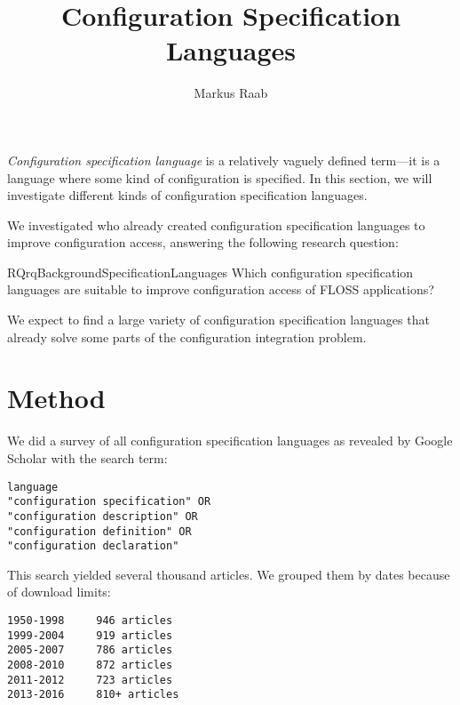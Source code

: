 



\setcounter{chapter}{1} %


\title{Configuration Specification Languages}
\author{Markus Raab}




\begin{titlingpage}
\maketitle
\doclicenseThis
\end{titlingpage}

\textit{Configuration specification language}
is a relatively vaguely defined term---it is a language where some kind of configuration is specified.
In this section, we will investigate different kinds of configuration specification languages.

We investigated who already created configuration specification languages to improve configuration access, answering the following research question:
\begin{restatable}{RQ}{rqBackgroundSpecificationLanguages}
 \label{rq:background-specification-languages}
 Which configuration specification languages are suitable to improve configuration access of FLOSS applications?
\end{restatable}

\begin{hypothesis}
We expect to find a large variety of configuration specification languages that already solve some parts of the configuration integration problem.
\end{hypothesis}

\section{Method}

We did a survey of all configuration specification languages as revealed by Google Scholar with the search term:
\begin{verbatim}
language
"configuration specification" OR
"configuration description" OR
"configuration definition" OR
"configuration declaration"
\end{verbatim}

This search yielded several thousand articles.
We grouped them by dates because of download limits:
\begin{verbatim}
1950-1998     946 articles
1999-2004     919 articles
2005-2007     786 articles
2008-2010     872 articles
2011-2012     723 articles
2013-2016     810+ articles
\end{verbatim}

